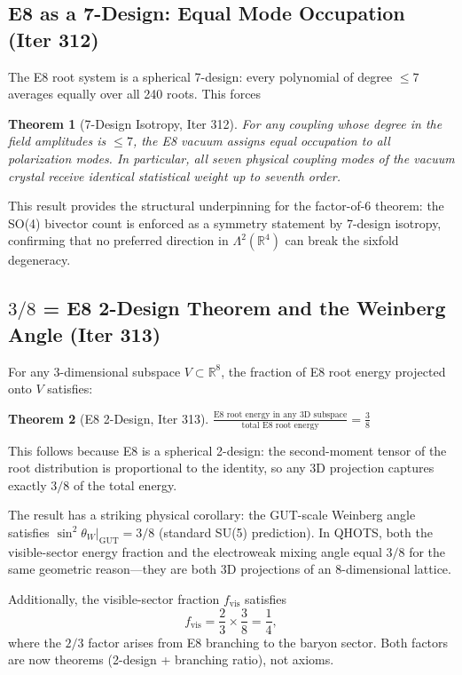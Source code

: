 \documentclass[aps,prd,twocolumn,superscriptaddress,floatfix,nofootinbib]{revtex4-2}
\newtheorem{theorem}{Theorem}
\theoremstyle{definition}
\theoremstyle{remark}
\begin{document}
\subsection{E8 as a 7-Design: Equal Mode Occupation (Iter 312)}
\label{sec:7design}

The E8 root system is a spherical 7-design: every polynomial of degree $\leq 7$
averages equally over all 240 roots.  This forces

\begin{theorem}[7-Design Isotropy, Iter 312]
For any coupling whose degree in the field amplitudes is $\leq 7$, the E8
vacuum assigns equal occupation to all polarization modes.  In particular,
all seven physical coupling modes of the vacuum crystal receive identical
statistical weight up to seventh order.
\end{theorem}

\noindent
This result provides the structural underpinning for the factor-of-6 theorem:
the SO(4) bivector count is enforced as a symmetry statement by 7-design
isotropy, confirming that no preferred direction in $\Lambda^2(\mathbb{R}^4)$
can break the sixfold degeneracy.

\subsection{$3/8$ = E8 2-Design Theorem and the Weinberg Angle (Iter 313)}
\label{sec:3-8-weinberg}

For any 3-dimensional subspace $V \subset \mathbb{R}^8$, the fraction of E8
root energy projected onto $V$ satisfies:

\begin{theorem}[E8 2-Design, Iter 313]
$\displaystyle\frac{\text{E8 root energy in any 3D subspace}}{\text{total E8 root energy}} = \frac{3}{8}$
\end{theorem}

\noindent
This follows because E8 is a spherical 2-design: the second-moment tensor of
the root distribution is proportional to the identity, so any 3D projection
captures exactly $3/8$ of the total energy.

The result has a striking physical corollary: the GUT-scale Weinberg angle
satisfies $\sin^2\theta_W|_{\mathrm{GUT}} = 3/8$ (standard SU(5) prediction).
In QHOTS, both the visible-sector energy fraction and the electroweak mixing
angle equal $3/8$ for the same geometric reason---they are both 3D projections
of an 8-dimensional lattice.

Additionally, the visible-sector fraction $f_{\mathrm{vis}}$ satisfies
\begin{equation}
  f_{\mathrm{vis}} = \frac{2}{3}\times\frac{3}{8} = \frac{1}{4},
\end{equation}
where the $2/3$ factor arises from E8 branching to the baryon sector.
Both factors are now theorems (2-design + branching ratio), not axioms.
\end{document}
